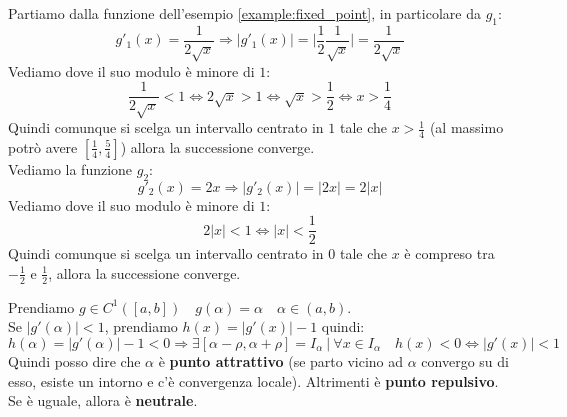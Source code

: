 \begin{example}
	Partiamo dalla funzione dell'esempio \ref{example:fixed_point}, in particolare da $g_1$:
	\begin{equation*}
		g'_1(x) = \frac{1}{2 \sqrt{x}} \Longrightarrow \lvert g'_1(x) \rvert = \lvert \frac{1}{2} \frac{1}{\sqrt{x}} \rvert = \frac{1}{2 \sqrt{x}}
	\end{equation*}
	Vediamo dove il suo modulo è minore di $1$:
	\begin{equation*}
		\frac{1}{2 \sqrt{x}} < 1 \Leftrightarrow 2 \sqrt{x} > 1 \Leftrightarrow \sqrt{x} > \frac{1}{2} \Leftrightarrow x> \frac{1}{4}
	\end{equation*}
	Quindi comunque si scelga un intervallo centrato in $1$ tale che $x>\frac{1}{4}$ (al massimo potrò avere $[\frac{1}{4}, \frac{5}{4}]$) allora la successione converge.\\
	Vediamo la funzione $g_2$:
	\begin{equation*}
		g'_2(x) = 2x \Longrightarrow \lvert g'_2(x) \rvert = \lvert 2x \rvert = 2 \lvert x \rvert
	\end{equation*}
	Vediamo dove il suo modulo è minore di $1$:
	\begin{equation*}
		2 \lvert x \rvert < 1 \Leftrightarrow \lvert x \rvert < \frac{1}{2}
	\end{equation*}
	Quindi comunque si scelga un intervallo centrato in $0$ tale che $x$ è compreso tra $-\frac{1}{2}$ e $\frac{1}{2}$, allora la successione converge.
\end{example}

\begin{theorem}
	Prendiamo $g \in C^1([a,b]) \quad g(\alpha)=\alpha \quad \alpha \in (a,b)$. \\
	Se $\lvert g'(\alpha) \rvert < 1$, prendiamo $h(x) = \lvert g'(x) \rvert -1$ quindi:
	\begin{equation*}
		h(\alpha) = \lvert g'(\alpha) \rvert -1 < 0 \Rightarrow \exists [\alpha-\rho, \alpha + \rho] = I_\alpha \:\vert\: \forall x \in I_\alpha \quad h(x)<0 \Leftrightarrow \lvert g'(x) \rvert <1
	\end{equation*}
	Quindi posso dire che $\alpha$ è \textbf{punto attrattivo} (se parto vicino ad $\alpha$ convergo su di esso, esiste un intorno e c'è convergenza locale). Altrimenti è \textbf{punto repulsivo}. Se è uguale, allora è \textbf{neutrale}.
\end{theorem}

